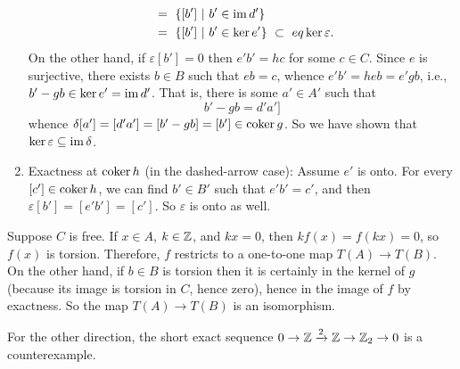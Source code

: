 \begin{enumerate}
\begin{align*}
~&=~ \{[b']~|~ b'\in\operatorname{im} d'\}\\
~&=~ \{[b']~|~ b'\in\ker e'\} ~\subset~eq \ker\varepsilon.
\end{align*}
On the other hand, if $\varepsilon[b']=0$ then $e'b'=hc$ for some $c\in C$.  Since $e$ is surjective, there exists $b\in B$ such that $eb=c$,
whence $e'b'=heb=e'gb$, i.e., $b'-gb\in\ker e'=\operatorname{im} d'$.  That is, there is some $a'\in A'$ such that
\[b'-gb=d'a']\]
whence $\delta[a']=[d'a']=[b'-gb]=[b']\in\operatorname{coker} g$.  So we have shown that $\ker\varepsilon\subseteq\operatorname{im}\delta$.
\\
\item Exactness at $\operatorname{coker} h$ (in the dashed-arrow case): Assume $e'$ is onto.  For every $[c']\in\operatorname{coker} h$, we can find $b'\in B'$ such that $e'b'=c'$, and then $\varepsilon[b']=[e'b']=[c']$.  So $\varepsilon$ is onto as well.
\end{enumerate}



\soln Suppose $C$ is free.  If $x\in A$, $k\in\mathbb{Z}$, and $kx=0$, then $kf(x)=f(kx)=0$, so $f(x)$ is torsion.  Therefore, $f$ restricts to a one-to-one map $T(A)\to T(B)$.  On the other hand, if $b\in B$ is torsion then it is certainly in the kernel of $g$ (because its image is torsion in $C$, hence zero), hence in the image of $f$ by exactness.  So the map $T(A)\to T(B)$ is an isomorphism.

For the other direction, the short exact sequence $0\to\mathbb{Z}\xrightarrow{2}\mathbb{Z}\to\mathbb{Z}_2\to 0$ is a counterexample.

\pagebreak


